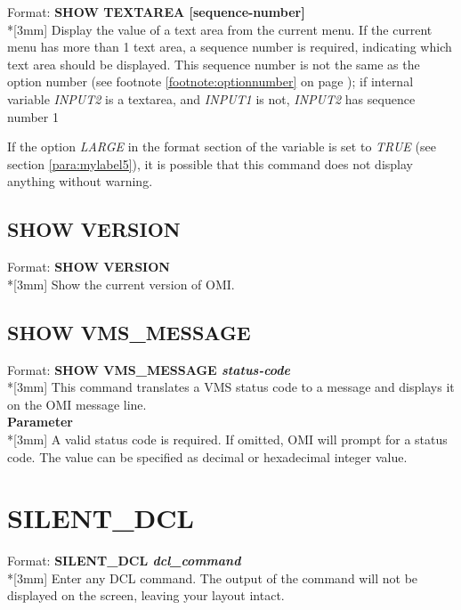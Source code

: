 \documentclass[a4paper]{book}
\newcommand{\vs}{\vspace{3mm}}
\renewcommand{\indent}{\hspace*{5mm}}
\begin{document}
\indent Format: \textbf{SHOW TEXTAREA [sequence-number]}\\*[3mm]
Display the value of a text area from the current menu. If the current menu 
has more than 1 text area, a sequence number is required, indicating which 
text area should be displayed. This sequence number is not the same as the 
option number (see footnote \ref{footnote:optionnumber} on page \pageref{footnote:optionnumber});
if internal variable \textsl{INPUT2} is a textarea, and \textsl{INPUT1} is not, 
\textsl{INPUT2} has sequence number 1

\vs

If the option \textsl{LARGE} in the format section of the variable is set to \textsl{TRUE} 
(see section \ref{para:mylabel5}), it is possible that this 
command does not display anything without warning.

\subsection{SHOW VERSION}
\label{subsubsec:mylabel84}

\indent Format: \textbf{SHOW VERSION}\\*[3mm]
Show the current version of OMI.

\subsection{SHOW VMS{\_}MESSAGE}
\label{subsubsec:mylabel85}

\indent Format: \textbf{SHOW VMS{\_}MESSAGE \textit{status-code}}\\*[3mm]
This command translates a VMS status code to a message and displays it on the 
OMI message line.\\[3mm]
\textbf{Parameter}\\*[3mm]
A valid status code is required. If omitted, OMI will prompt for a status 
code. The value can be specified as decimal or hexadecimal integer value.

\section{SILENT{\_}DCL}
\label{subsec:silent}

\indent Format: \textbf{SILENT{\_}DCL \textit{dcl{\_}command}}\\*[3mm]
Enter any DCL command. The output of the command will not be displayed on 
the screen, leaving your layout intact.
\end{document}
